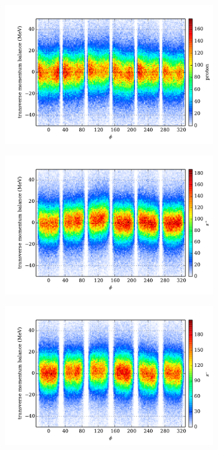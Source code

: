 \begin{figure}\begin{center}
\begin{subfigure}{0.4\columnwidth}
    \includegraphics[width=\columnwidth]{figures/pcor/pcor_mptbal_fixed_p.pdf}
\end{subfigure}
\begin{subfigure}{0.4\columnwidth}
    \includegraphics[width=\columnwidth]{figures/pcor/pcor_mptbal_fixed_pip.pdf}
\end{subfigure}
\begin{subfigure}{0.4\columnwidth}
    \includegraphics[width=\columnwidth]{figures/pcor/pcor_mptbal_fixed_pim.pdf}

\end{subfigure}
\end{center}
\end{figure}
